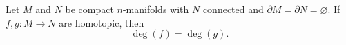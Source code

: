 Let $M$ and $N$ be compact $n$-manifolds with $N$ connected and $\partial M = \partial N = \varnothing$. If $f, g: M \to N$ are homotopic, then
$$\deg(f) = \deg(g).$$
